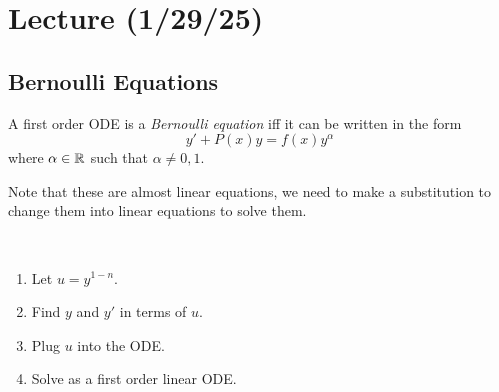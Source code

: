 \documentclass[notes]{subfiles}
\begin{document}
\setcounter{section}{5}
\section{Lecture (1/29/25)}

\subsection{Bernoulli Equations}
\begin{definition}
    A first order ODE is a \textsl{Bernoulli equation} iff it can be written in the form
    \[
        y' + P(x)y = f(x)y^\alpha
    \]
    where $\alpha \in \mathbb{R}$ such that $\alpha \neq 0, 1$.
\end{definition}
Note that these are almost linear equations, we need to make a substitution to change them into linear equations to solve them.
\begin{procedure} ~\par
    \begin{enumerate}[label = (\arabic*)]
        \item Let $u = y^{1 - n}$.
        \item Find $y$ and $y'$ in terms of $u$.
        \item Plug $u$ into the ODE.
        \item Solve as a first order linear ODE.
    \end{enumerate}
\end{procedure}
\end{document}
